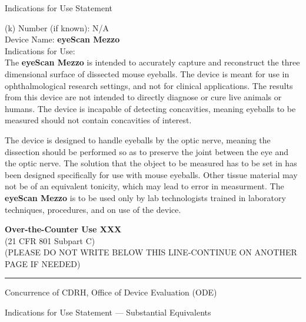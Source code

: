 \newpage
{}
\singlespacing
\begin{center}
  \large{Indications for Use Statement}
\end{center}

\onehalfspacing

(k) Number (if known): N/A \\
Device Name: \textbf{eyeScan Mezzo} \\
Indications for Use: \\

The \textbf{eyeScan Mezzo} is intended to accurately capture and
reconstruct the three dimensional surface of dissected mouse
eyeballs. The device is meant for use in ophthalmological research
settings, and not for clinical applications. The results from this
device are not intended to directly diagnose or cure live animals or
humans. The device is incapable of detecting concavities, meaning
eyeballs to be measured should not contain concavities of interest.

The device is designed to handle eyeballs by the optic nerve, meaning
the dissection should be performed so as to preserve the joint between
the eye and the optic nerve. The solution that the object to be
measured has to be set in has been designed specifically for use with
mouse eyeballs. Other tissue material may not be of an equivalent
tonicity, which may lead to error in measurment. The \textbf{eyeScan
  Mezzo} is to be used only by lab technologists trained in laboratory
techniques, procedures, and on use of the device.

\vfill

\noindent \textbf{Over-the-Counter Use XXX} \\
(21 CFR 801 Subpart C)\\[1em]

\noindent (PLEASE DO NOT WRITE BELOW THIS LINE-CONTINUE ON ANOTHER PAGE IF
NEEDED)

\rule{\linewidth}{0.5mm}
\begin{center}
  Concurrence of CDRH, Office of Device Evaluation (ODE)
\end{center}

\vspace{5em}

\newpage
\singlespacing
{}
\begin{center}
  \large{Indications for Use Statement --- Substantial Equivalents}
\end{center}

